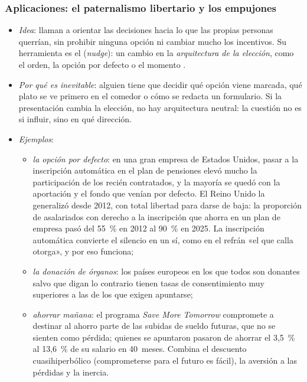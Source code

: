\documentclass[11pt]{article}
\begin{document}
\subsubsection{Aplicaciones: el paternalismo libertario y los empujones}\label{sec:aplicaciones-conductual}

\begin{itemize}
\item \emph{Idea}: \textcite{ThalerSunstein2003Libertarian} llaman  a orientar las decisiones hacia lo que las propias personas querrían, sin prohibir ninguna opción ni cambiar mucho los incentivos. Su herramienta es el  (\emph{nudge}): un cambio en la \emph{arquitectura de la elección}, como el orden, la opción por defecto o el momento\nocite{ThalerSunstein2008Nudge} .
\item \emph{Por qué es inevitable}: alguien tiene que decidir qué opción viene marcada, qué plato se ve primero en el comedor o cómo se redacta un formulario. Si la presentación cambia la elección, no hay arquitectura neutral: la cuestión no es si influir, sino en qué dirección.
\item \emph{Ejemplos}:
  \begin{itemize}
  \item \emph{la opción por defecto}: en una gran empresa de Estados Unidos, pasar a la inscripción automática en el plan de pensiones elevó mucho la participación de los recién contratados, y la mayoría se quedó con la aportación y el fondo que venían por defecto\nocite{MadrianShea2001Power}. El Reino Unido la generalizó desde 2012, con total libertad para darse de baja: la proporción de asalariados con derecho a la inscripción que ahorra en un plan de empresa pasó del 55~\% en 2012 al 90~\% en 2025\nocite{DWP2017Review,DWP2026Trends}. La inscripción automática convierte el silencio en un sí, como en el refrán «el que calla otorga», y por eso funciona;
  \item \emph{la donación de órganos}: los países europeos en los que todos son donantes salvo que digan lo contrario tienen tasas de consentimiento muy superiores a las de los que exigen apuntarse\nocite{JohnsonGoldstein2003Defaults};
  \item \emph{ahorrar mañana}: el programa \emph{Save More Tomorrow} compromete a destinar al ahorro parte de las subidas de sueldo futuras, que no se sienten como pérdida; quienes se apuntaron pasaron de ahorrar el 3,5~\% al 13,6~\% de su salario en 40~meses\nocite{ThalerBenartzi2004Save}. Combina el descuento cuasihiperbólico (comprometerse para el futuro es fácil), la aversión a las pérdidas y la inercia.

\end{itemize}
\end{itemize}
\end{document}

